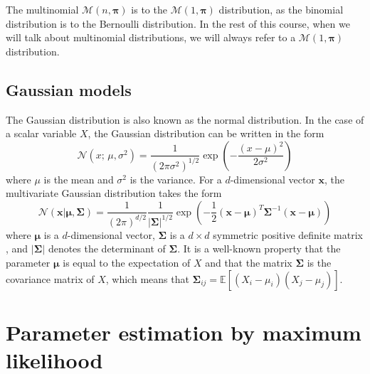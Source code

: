 \documentclass[12pt]{report}	%
\def\EE{\mathbb{E}}
\begin{document}
The multinomial $\mathcal{M}(n,\bm{\pi})$ is to the $\mathcal{M}(1,\bm{\pi})$ distribution, as the binomial distribution is to the Bernoulli distribution. In the rest of this course, when we will talk about multinomial distributions, we will always refer to a $\mathcal{M}(1,\bm{\pi})$ distribution.

\subsection{Gaussian models}
The Gaussian distribution is also known as the normal distribution. In the case of a scalar variable $X$, the Gaussian distribution can be written in the form
\begin{equation}
\label{eq:gaussian1}
\mathcal{N}(x; \, \mu,\sigma^2)=\frac{1}{(2\pi\sigma^2)^{1/2}}\exp\left(-\frac{(x-\mu)^2}{2\sigma^2}\right)
\end{equation} 
where $\mu$ is the mean and $\sigma^2$ is the variance. For a $d$-dimensional vector $\mathbf{x}$, the multivariate Gaussian distribution takes the form
\begin{equation}
\label{eq:gaussian2}
\mathcal{N}(\mathbf{x}|\bm{\mu},\bm{\Sigma})=\frac{1}{(2\pi)^{d/2}}\frac{1}{|\bm{\Sigma}|^{1/2}}\exp\left(-\frac{1}{2}(\mathbf{x}-\bm{\mu})^T\bm{\Sigma}^{-1}(\mathbf{x}-\bm{\mu})\right)
\end{equation}
where $\bm{\mu}$ is a $d$-dimensional vector, $\bm{\Sigma}$ is a $d\times d$ symmetric positive definite matrix , and $|\bm{\Sigma}|$ denotes the determinant of $\bm{\Sigma}$.
It is a well-known property that the parameter $\bm{\mu}$ is equal to the expectation of $X$ and that the matrix $\bm{\Sigma}$ is the covariance matrix of $X$, which means that $\bm{\Sigma}_{ij}=\EE[(X_i-\mu_i)(X_j-\mu_j)]$.


\section{Parameter estimation by maximum likelihood}
\end{document}
